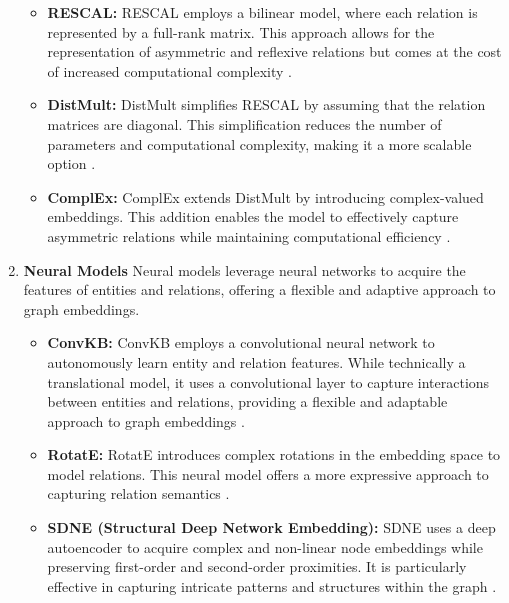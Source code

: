\begin{enumerate}
        \begin{itemize}
            \item \textbf{RESCAL:} RESCAL employs a bilinear model, where each relation is represented by a full-rank matrix. This approach allows for the representation of asymmetric and reflexive relations but comes at the cost of increased computational complexity \cite{hogan_knowledge_2022}.
            
            \item \textbf{DistMult:} DistMult simplifies RESCAL by assuming that the relation matrices are diagonal. This simplification reduces the number of parameters and computational complexity, making it a more scalable option \cite{hogan_knowledge_2022}.
            
            \item \textbf{ComplEx:} ComplEx extends DistMult by introducing complex-valued embeddings. This addition enables the model to effectively capture asymmetric relations while maintaining computational efficiency \cite{hogan_knowledge_2022}.
        \end{itemize}

        \item \textbf{Neural Models} Neural models leverage neural networks to acquire the features of entities and relations, offering a flexible and adaptive approach to graph embeddings.

        \begin{itemize}
            \item \textbf{ConvKB:} ConvKB employs a convolutional neural network to autonomously learn entity and relation features. While technically a translational model, it uses a convolutional layer to capture interactions between entities and relations, providing a flexible and adaptable approach to graph embeddings \cite{nguyen_novel_2018}.
            
            \item \textbf{RotatE:} RotatE introduces complex rotations in the embedding space to model relations. This neural model offers a more expressive approach to capturing relation semantics \cite{hogan_knowledge_2022}.
            
            \item \textbf{SDNE (Structural Deep Network Embedding):} SDNE uses a deep autoencoder to acquire complex and non-linear node embeddings while preserving first-order and second-order proximities. It is particularly effective in capturing intricate patterns and structures within the graph \cite{wang_structural_2016}.
            

\end{itemize}
\end{enumerate}
